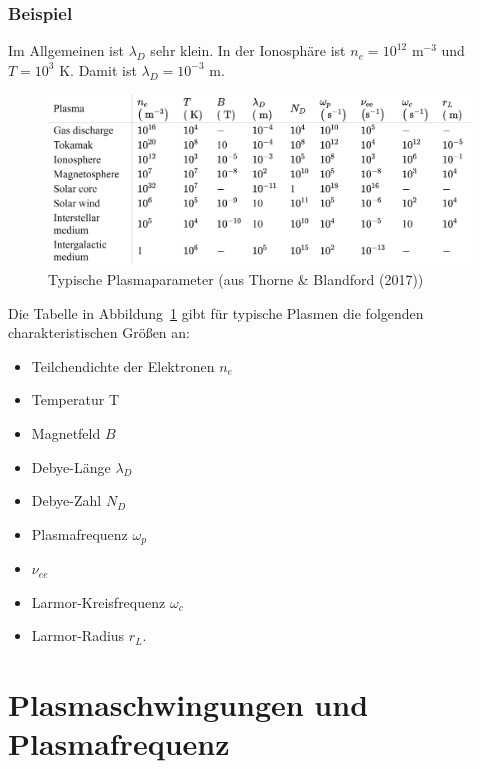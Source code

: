 \documentclass[
  a4paper,
  DIV=11]{scrreprt}
\providecommand{\tightlist}{%
  \setlength{\itemsep}{0pt}\setlength{\parskip}{0pt}}\usepackage{longtable,booktabs,array}
\begin{document}
\hypertarget{beispiel}{%
\subsubsection{Beispiel}\label{beispiel}}

Im Allgemeinen ist \(\lambda_D\) sehr klein. In der Ionosphäre ist
\(n_e = 10^{12}\) m\(^{-3}\) und \(T=10^3\) K. Damit ist
\(\lambda_D = 10^{-3}\) m.

\begin{figure}

{\centering \includegraphics{./images/paste-2A0EC69D.png}

}

\caption{\label{fig-tabelle201}Typische Plasmaparameter (aus Thorne \&
Blandford (2017))}

\end{figure}

Die Tabelle in Abbildung~\ref{fig-tabelle201} gibt für typische Plasmen
die folgenden charakteristischen Größen an:

\begin{itemize}
\tightlist
\item
  Teilchendichte der Elektronen \(n_e\)
\item
  Temperatur T
\item
  Magnetfeld \(B\)
\item
  Debye-Länge \(\lambda_D\)
\item
  Debye-Zahl \(N_D\)
\item
  Plasmafrequenz \(\omega_p\)
\item
  \(\nu_{ee}\)
\item
  Larmor-Kreisfrequenz \(\omega_c\)
\item
  Larmor-Radius \(r_L\).
\end{itemize}

\hypertarget{plasmaschwingungen-und-plasmafrequenz}{%
\section{Plasmaschwingungen und
Plasmafrequenz}\label{plasmaschwingungen-und-plasmafrequenz}}
\end{document}

